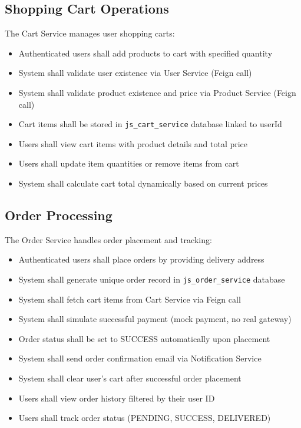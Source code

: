 \subsection{Shopping Cart Operations}

The Cart Service manages user shopping carts:

\begin{itemize}
    \item Authenticated users shall add products to cart with specified quantity
    \item System shall validate user existence via User Service (Feign call)
    \item System shall validate product existence and price via Product Service (Feign call)
    \item Cart items shall be stored in \texttt{js\_cart\_service} database linked to userId
    \item Users shall view cart items with product details and total price
    \item Users shall update item quantities or remove items from cart
    \item System shall calculate cart total dynamically based on current prices
\end{itemize}

\subsection{Order Processing}

The Order Service handles order placement and tracking:

\begin{itemize}
    \item Authenticated users shall place orders by providing delivery address
    \item System shall generate unique order record in \texttt{js\_order\_service} database
    \item System shall fetch cart items from Cart Service via Feign call
    \item System shall simulate successful payment (mock payment, no real gateway)
    \item Order status shall be set to SUCCESS automatically upon placement
    \item System shall send order confirmation email via Notification Service
    \item System shall clear user's cart after successful order placement
    \item Users shall view order history filtered by their user ID
    \item Users shall track order status (PENDING, SUCCESS, DELIVERED)
\end{itemize}

